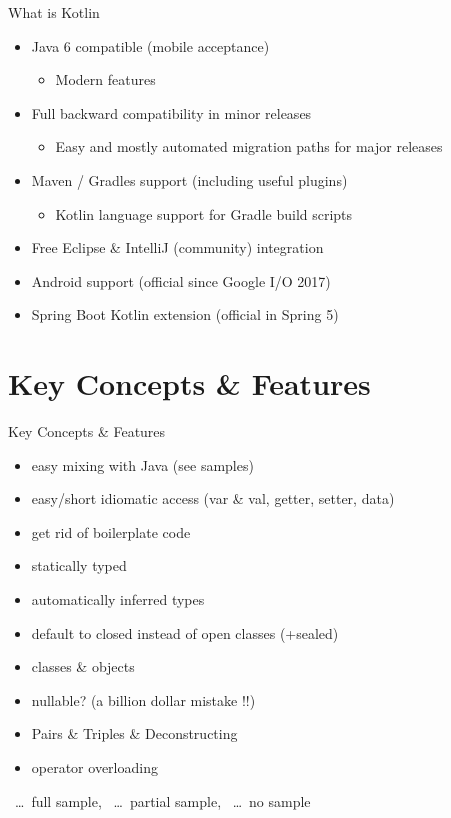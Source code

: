 \begin{frame}{What is Kotlin}
	\begin{itemize}
		\item Java 6 compatible (mobile acceptance)
		\begin{itemize}
			\item Modern features 
		\end{itemize}
		\item Full backward compatibility in minor releases
		\begin{itemize}
			\item Easy and mostly automated migration paths for major releases 
		\end{itemize}
		\item Maven / Gradles support (including useful plugins)
		\begin{itemize}
			\item Kotlin language support for Gradle build scripts
		\end{itemize}
		\item Free Eclipse \& IntelliJ (community) integration
		\item Android support (official since Google I/O 2017)
		\item Spring Boot Kotlin extension (official in Spring 5)
	\end{itemize}
\end{frame}

\section{Key Concepts \& Features}

\begin{frame}{Key Concepts \& Features}
	\begin{itemize}
		\item easy mixing with Java (see samples) \cmark
		\item easy/short idiomatic access (var \& val, getter, setter, data) \cmark
		\item get rid of boilerplate code \cmark
		\item statically typed \cmark
		\item automatically inferred types \cmark
		\item default to closed instead of open classes (+sealed) \tmark
		\item classes \& objects \tmark
		\item nullable? (a billion dollar mistake !!) \cmark
		\item Pairs \& Triples \& Deconstructing \cmark
		\item operator overloading \cmark
	\end{itemize}
\cmark\ \dots\ full sample, \tmark\ \dots\ partial sample, \xmark\ \dots\ no sample
\end{frame}


